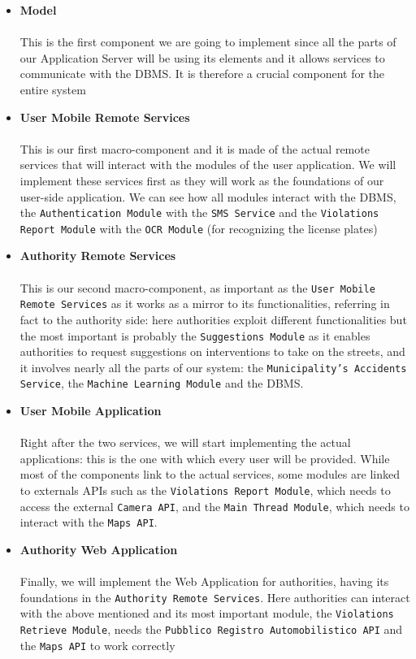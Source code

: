 \documentclass[12pt,a4paper]{article}
\begin{document}
\begin{itemize}
\item \textbf{Model}\\\\
This is the first component we are going to implement since all the parts of our Application Server will be using its elements and it allows services to communicate with the DBMS. It is therefore a crucial component for the entire system
\item \textbf{User Mobile Remote Services}\\\\
This is our first macro-component and it is made of the actual remote services that will interact with the modules of the user application. We will implement these services first as they will work as the foundations of our user-side application. We can see how all modules interact with the DBMS, the \texttt{Authentication Module} with the \texttt{SMS Service} and the \texttt{Violations Report Module} with the \texttt{OCR Module} (for recognizing the license plates)
\item \textbf{Authority Remote Services}\\\\
This is our second macro-component, as important as the \texttt{User Mobile Remote Services} as it works as a mirror to its functionalities, referring in fact to the authority side: here authorities exploit different functionalities but the most important is probably the \texttt{Suggestions Module} as it enables authorities to request suggestions on interventions to take on the streets, and it involves nearly all the parts of our system: the \texttt{Municipality's Accidents Service}, the \texttt{Machine Learning Module} and the DBMS.
\item \textbf{User Mobile Application}\\\\
Right after the two services, we will start implementing the actual applications: this is the one with which every user will be provided. While most of the components link to the actual services, some modules are linked to externals APIs such as the \texttt{Violations Report Module}, which needs to access the external \texttt{Camera API}, and the \texttt{Main Thread Module}, which needs to interact with the \texttt{Maps API}. 
\item \textbf{Authority Web Application}\\\\
Finally, we will implement the Web Application for authorities, having its foundations in the \texttt{Authority Remote Services}. Here authorities can interact with the above mentioned and its most important module, the \texttt{Violations Retrieve Module}, needs the \texttt{Pubblico Registro Automobilistico API} and the \texttt{Maps API} to work correctly
\end{itemize}
\end{document}
